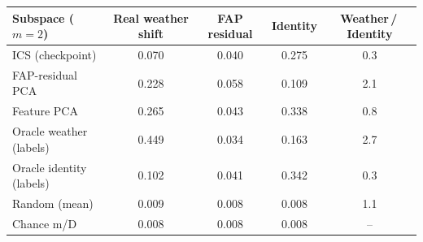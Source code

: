 \begin{tabular}{lcccc}
\toprule
Subspace ($m{=}2$) & Real weather shift & FAP residual & Identity & Weather\,/\,Identity \\
\midrule
ICS (checkpoint) & 0.070 & 0.040 & 0.275 & 0.3 \\
FAP-residual PCA & 0.228 & 0.058 & 0.109 & 2.1 \\
Feature PCA & 0.265 & 0.043 & 0.338 & 0.8 \\
Oracle weather (labels) & 0.449 & 0.034 & 0.163 & 2.7 \\
Oracle identity (labels) & 0.102 & 0.041 & 0.342 & 0.3 \\
Random (mean) & 0.009 & 0.008 & 0.008 & 1.1 \\
Chance m/D & 0.008 & 0.008 & 0.008 & -- \\
\bottomrule
\end{tabular}
